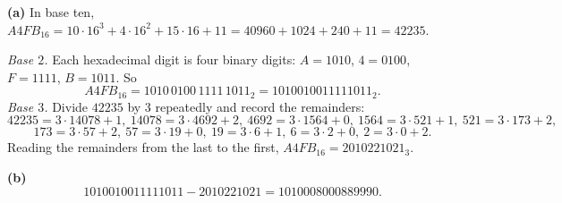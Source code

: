 \textbf{(a)} In base ten, $A4FB_{16}=10\cdot16^3+4\cdot16^2+15\cdot16+11=40960+1024+240+11=42235$.

\emph{Base $2$.} Each hexadecimal digit is four binary digits: $A=1010$, $4=0100$, $F=1111$, $B=1011$. So
\[A4FB_{16}=1010\,0100\,1111\,1011_2=1010010011111011_2.\]
\emph{Base $3$.} Divide $42235$ by $3$ repeatedly and record the remainders:
\[42235=3\cdot14078+1,\ 14078=3\cdot4692+2,\ 4692=3\cdot1564+0,\ 1564=3\cdot521+1,\ 521=3\cdot173+2,\]
\[173=3\cdot57+2,\ 57=3\cdot19+0,\ 19=3\cdot6+1,\ 6=3\cdot2+0,\ 2=3\cdot0+2.\]
Reading the remainders from the last to the first, $A4FB_{16}=2010221021_3$.

\textbf{(b)} \[1010010011111011-2010221021=\boxed{1010008000889990}.\]
